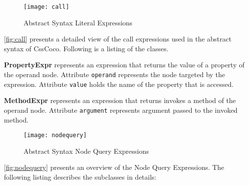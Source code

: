 \begin{figure}[h]
  \centering
  \caption{Abstract Syntax Literal Expressions}
  \label{fig:call}
  \texttt{[image: call]}
\end{figure}

\autoref{fig:call} presents a detailed view of the call expressions used in the abstract syntax of CssCoco. Following is a listing of the classes. 

\begin{description}

\item\textbf{PropertyExpr} represents an expression that returns the value of a property of the operand node. Attribute \texttt{operand} represents the node targeted by the expression. Attribute \texttt{value} holds the name of the property that is accessed.

\item\textbf{MethodExpr} represents an expression that returns invokes a method of the operand node. Attribute \texttt{argument} represents argument passed to the invoked method.

\end{description}

\begin{figure}[h]
  \centering
  \caption{Abstract Syntax Node Query Expressions}
  \label{fig:nodequery}
  \texttt{[image: nodequery]}
\end{figure}

\autoref{fig:nodequery} presents an overview of the Node Query Expressions. The following listing describes the subclasses in details:

